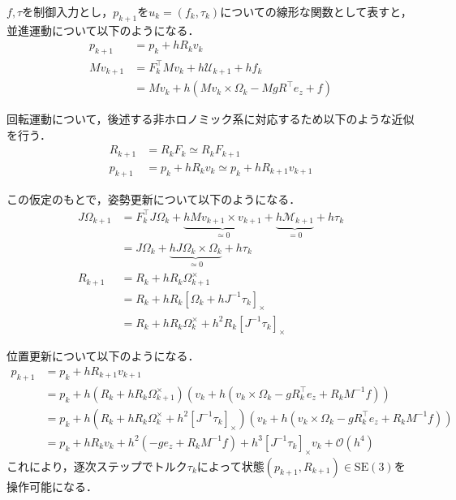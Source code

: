 $f, \tau$を制御入力とし，$p_{k+1}$を$u_k = (f_k, \tau_k)$についての線形な関数として表すと，並進運動について以下のようになる．
\begin{equation}
\begin{aligned}
p_{k+1} &= p_k + h R_k v_k \\
M v_{k+1} &= F_k^\top M v_k + h \mathcal{U}_{k+1} + h f_k \\
&= M v_k + h (M v_k \times \Omega_k - M g R^\top e_z + f)
\label{eq:translation_dynamics}
\end{aligned}
\end{equation}

回転運動について，後述する非ホロノミック系に対応するため以下のような近似を行う．
\begin{equation}
\begin{aligned}
R_{k+1} &= R_k F_k \simeq R_k F_{k+1} \\
p_{k+1} &= p_k + h R_{k} v_{k} \simeq p_k + h R_{k+1} v_{k+1}
\label{eq:rotation_approximation_2}
\end{aligned}
\end{equation}

この仮定のもとで，姿勢更新について以下のようになる．
\begin{equation}
\begin{aligned}
J \Omega_{k+1} &= F_k^\top J \Omega_{k} + \underbrace{h M v_{k+1} \times v_{k+1}}_{\simeq 0} + \underbrace{h \mathcal{M}_{k+1}}_{= 0} + h \tau_k \\
&= J \Omega_k + \underbrace{h J \Omega_k \times \Omega_k}_{\simeq 0} + h \tau_k \\
R_{k+1} &= R_{k} + h R_{k} \Omega_{k+1}^\times \\
&= R_{k} + h R_{k} [\Omega_k + h J^{-1} \tau_k]_\times \\
&= R_k + h R_k \Omega_k^\times + h^2 R_{k} [J^{-1} \tau_k]_\times
\label{eq:rotation_update}
\end{aligned}
\end{equation}

位置更新について以下のようになる．
\begin{equation}
\begin{aligned}
p_{k+1} &= p_k + h R_{k+1} v_{k+1} \\
&= p_k + h (R_k + h R_k \Omega_{k+1}^\times) (v_k + h (v_k \times \Omega_{k} - g R_k^\top e_z + R_k M^{-1} f)) \\
&= p_k + h (R_k + h R_k \Omega_k^\times + h^2 [J^{-1} \tau_k]_\times) (v_k + h (v_k \times \Omega_{k} - g R_k^\top e_z + R_k M^{-1} f)) \\
&= p_k + h R_k v_k + h^2 (-g e_z + R_k M^{-1} f) + h^3 [J^{-1} \tau_k]_\times v_k + \mathcal{O}(h^4)
\label{eq:position_update}
\end{aligned}
\end{equation}
これにより，逐次ステップでトルク$\tau_k$によって状態$(p_{k+1}, R_{k+1}) \in \mathrm{SE}(3)$を操作可能になる．


